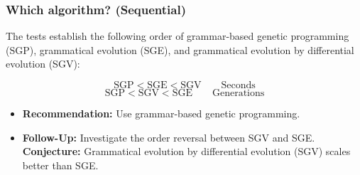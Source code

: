\begin{frame}
\frametitle{
Which algorithm? (Sequential)
}
The tests establish the following order of grammar-based genetic programming (SGP), 
grammatical evolution (SGE), and grammatical evolution by differential evolution (SGV):
 
\begin{displaymath}
\mbox{SGP} < \mbox{SGE} < \mbox{SGV} \quad\quad \mbox{Seconds}
\end{displaymath}
\begin{displaymath}
\mbox{SGP} < \mbox{SGV} < \mbox{SGE} \quad\quad \mbox{Generations}
\end{displaymath}
 
\begin{itemize}
\item {\bf Recommendation:} Use grammar-based genetic programming.
\item {\bf Follow-Up:} Investigate the order reversal between SGV and SGE.
   {\bf Conjecture:} Grammatical evolution by differential evolution (SGV) scales better than SGE.
\end{itemize}
\end{frame}